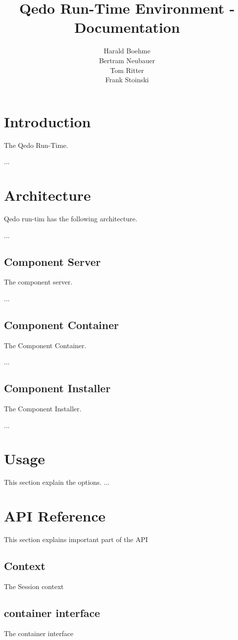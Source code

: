 \documentclass[12pt,a4paper]{report}
\begin{document}
\title{Qedo Run-Time Environment - Documentation}
\author{Harald Boehme \\ Bertram Neubauer \\ Tom Ritter \\ Frank Stoinski}

\maketitle

\setcounter{page}{1} 

\tableofcontents


\chapter{Introduction}
\label{sec:Introduction}

The Qedo Run-Time.

...

\chapter{Architecture}
\label{sec:Architecture}
Qedo run-tim has the following architecture.

 ...

\section{Component Server}
\label{sec:ComponentServer}
The component server. 

 ... 

\section{Component Container}
\label{sec:ComponentContainer}
The Component Container. 

...

\section{Component Installer}
\label{sec:ComponentInstaller}
The Component Installer.

...

\chapter{Usage}
\label{sec:Usage}
This section explain the options. ...

\chapter{API Reference}
\label{sec:APIReference}

This section explains important part of the API

\section{Context}
\label{sec:Context}

The Session context


\section{container interface}
\label{sec:containerInterface}
The container interface
\end{document}
